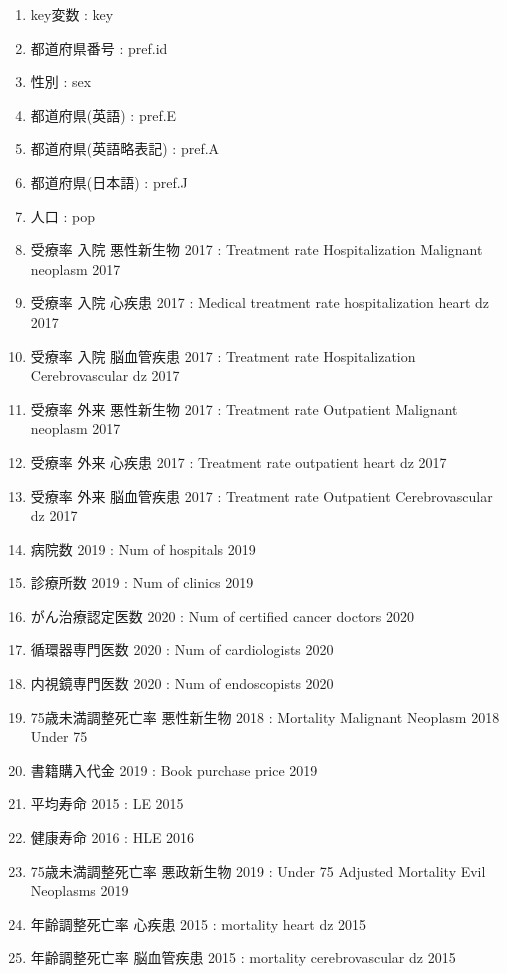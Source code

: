 \begin{multicols}{2}


\begin{enumerate}
  \item key変数 : key
  \item 都道府県番号 : pref.id
  \item 性別 : sex
  \item 都道府県(英語) : pref.E
  \item 都道府県(英語略表記) : pref.A
  \item 都道府県(日本語) : pref.J
  \item 人口 : pop
  \item 受療率 入院 悪性新生物 2017  :  Treatment rate Hospitalization Malignant neoplasm 2017
  \item 受療率 入院 心疾患 2017  :  Medical treatment rate hospitalization heart dz 2017
  \item 受療率 入院 脳血管疾患 2017  :  Treatment rate Hospitalization Cerebrovascular dz 2017
  \item 受療率 外来 悪性新生物 2017  :  Treatment rate Outpatient Malignant neoplasm 2017
  \item 受療率 外来 心疾患 2017  :  Treatment rate outpatient heart dz 2017
  \item 受療率 外来 脳血管疾患 2017  :  Treatment rate Outpatient Cerebrovascular dz 2017
  \item 病院数 2019  :  Num of hospitals 2019
  \item 診療所数 2019  :  Num of clinics 2019
  \item がん治療認定医数 2020  :  Num of certified cancer doctors 2020
  \item 循環器専門医数 2020  :  Num of cardiologists 2020
  \item 内視鏡専門医数 2020  :  Num of endoscopists 2020
  \item 75歳未満調整死亡率 悪性新生物 2018  :  Mortality Malignant Neoplasm 2018 Under 75
  \item 書籍購入代金 2019  :  Book purchase price 2019
  \item 平均寿命 2015  :  LE 2015
  \item 健康寿命 2016  :  HLE 2016
  \item 75歳未満調整死亡率 悪政新生物 2019  :  Under 75 Adjusted Mortality Evil Neoplasms 2019
  \item 年齢調整死亡率 心疾患 2015  :  mortality heart dz 2015
  \item 年齢調整死亡率 脳血管疾患 2015  :  mortality cerebrovascular dz 2015

\end{enumerate}
\end{multicols}
